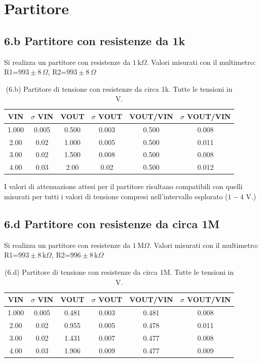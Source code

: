 \documentclass[10pt,a4paper]{article}
\begin{document}
\section{Partitore}

\subsection*{6.b Partitore con resistenze da 1k}

Si realizza un partitore con resistenze da $1 \,\mathrm{k}\Omega$.
Valori misurati con il multimetro: R1=$993 \pm 8 \,\Omega$,
R2=$993 \pm 8 \,\Omega$


\begin{table}[h]
\centering
\begin{tabular}{|c|c|c|c|c|c|}
\hline 
VIN& $\sigma$ VIN  & VOUT	 & $\sigma$ VOUT & VOUT/VIN & $\sigma$ VOUT/VIN \\
\hline 
1.000 & 0.005 & 0.500 & 0.003 & 0.500 & 0.008 \\
2.00 & 0.02 & 1.000 & 0.005 & 0.500 & 0.011 \\
3.00 & 0.02 & 1.500 & 0.008 & 0.500 &0.008 \\
4.00 & 0.03 & 2.00 & 0.02 & 0.500 & 0.012 \\
\hline 
\end{tabular} 
\caption{(6.b) Partitore di tensione con resistenze da circa 1k. Tutte le
tensioni in V.\label{tab:div1k}}
\end{table}

I valori di attenuazione attesi per il partitore risultano compatibili
con quelli misurati per tutti i valori di tensione compresi nell'intervallo
esplorato ($1 - 4$ V.)

\subsection*{6.d Partitore con resistenze da circa 1M}
\par
Si realizza un partitore con resistenze da $1 \,\mathrm{M}\Omega$.
Valori misurati con il multimetro: R1=$993 \pm 8 \,\mathrm{k}\Omega$,
R2=$996 \pm 8 \,\mathrm{k}\Omega$


\begin{table}[h]
\centering
\begin{tabular}{|c|c|c|c|c|c|}
\hline 
VIN& $\sigma$ VIN  &VOUT	 & $\sigma$ VOUT& VOUT/VIN & $\sigma$ VOUT/VIN \\
\hline 
1.000 & 0.005 & 0.481 & 0.003 & 0.481 & 0.008 \\
2.00 & 0.02 & 0.955 & 0.005 & 0.478 & 0.011 \\
3.00 & 0.02 & 1.431 & 0.007 & 0.477 & 0.008 \\
4.00 & 0.03 & 1.906 & 0.009 & 0.477 & 0.009 \\
\hline 
\end{tabular} 
\caption{(6.d) Partitore di tensione con resistenze da circa 1M.
Tutte le tensioni in V.\label{tab:div1M}}
\end{table}
\end{document}
